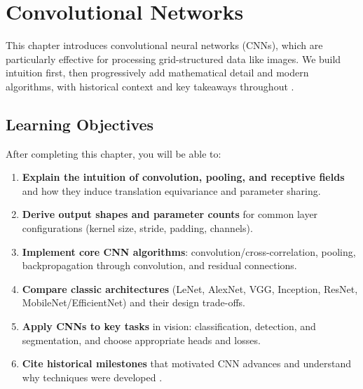 
\chapter{Convolutional Networks}
\label{chap:convolutional-networks}

This chapter introduces convolutional neural networks (CNNs), which are particularly effective for processing grid-structured data like images. We build intuition first, then progressively add mathematical detail and modern algorithms, with historical context and key takeaways throughout \cite{GoodfellowEtAl2016,Prince2023}.

\section*{Learning Objectives}
\label{sec:ch9-learning-objectives}

After completing this chapter, you will be able to:

\begin{enumerate}
    \item \textbf{Explain the intuition of convolution, pooling, and receptive fields} and how they induce translation equivariance and parameter sharing.
    \item \textbf{Derive output shapes and parameter counts} for common layer configurations (kernel size, stride, padding, channels).
    \item \textbf{Implement core CNN algorithms}: convolution/cross-correlation, pooling, backpropagation through convolution, and residual connections.
    \item \textbf{Compare classic architectures} (LeNet, AlexNet, VGG, Inception, ResNet, MobileNet/EfficientNet) and their design trade-offs.
    \item \textbf{Apply CNNs to key tasks} in vision: classification, detection, and segmentation, and choose appropriate heads and losses.
    \item \textbf{Cite historical milestones} that motivated CNN advances and understand why techniques were developed \cite{LeCun1989,Krizhevsky2012,He2016,Ronneberger2015}.
\end{enumerate}














